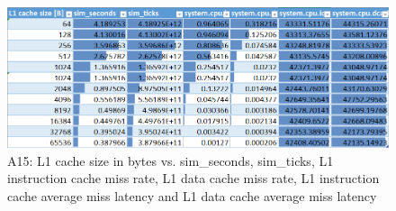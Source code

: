 \documentclass[a4paper, 10pt, conference]{ieeeconf}      %
\begin{document}
\begin{figure}[thpb]
\centering
\includegraphics[scale=0.7]{Figures/assignment2_2_table.png}
\caption{A15: L1 cache size in bytes vs. sim\_seconds, sim\_ticks, L1 instruction cache miss rate, L1 data cache miss rate, L1 instruction cache average miss latency and L1 data cache average miss latency}
\label{Afigure2_2}
\end{figure}
\end{document}
